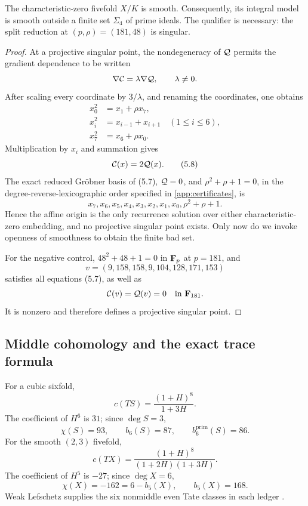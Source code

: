 \begin{proposition}\label{prop:smoothness}
The characteristic-zero fivefold \(X/K\) is smooth.  Consequently, its
integral model is smooth outside a finite set \(\Sigma_4\) of prime ideals.
The qualifier is necessary: the split reduction at
\((p,\rho)=(181,48)\) is singular.
\end{proposition}

\begin{proof}
At a projective singular point, the nondegeneracy of \(\mathcal Q\) permits the
gradient dependence to be written
\[
 \nabla\mathcal C=\lambda\nabla\mathcal Q,\qquad \lambda\ne0.
\]
After scaling every coordinate by \(3/\lambda\), and renaming the
coordinates, one obtains
\[
\begin{aligned}
 x_0^2&=x_1+\rho x_7,\\
 x_i^2&=x_{i-1}+x_{i+1}\quad(1\le i\le6),\\
 x_7^2&=x_6+\rho x_0.
\end{aligned}                                           \tag{5.7}
\]
Multiplication by \(x_i\) and summation gives
\[
 \mathcal C(x)=2\mathcal Q(x).                                       \tag{5.8}
\]
The exact reduced Gr\"obner basis of (5.7), \(\mathcal Q=0\), and
\(\rho^2+\rho+1=0\), in the degree-reverse-lexicographic order specified in
\cref{app:certificates}, is
\[
 x_7,x_6,x_5,x_4,x_3,x_2,x_1,x_0,\rho^2+\rho+1.        \tag{5.9}
\]
Hence the affine origin is the only recurrence solution over either
characteristic-zero embedding, and no projective singular point exists.
Only now do we invoke openness of smoothness to obtain the finite bad set.

For the negative control, \(48^2+48+1=0\) in \(\mathbf F_p\) at \(p=181\), and
\[
 v=(9,158,158,9,104,128,171,153)                       \tag{5.10}
\]
satisfies all equations (5.7), as well as
\[
 \mathcal C(v)=\mathcal Q(v)=0\quad\text{in }\mathbf F_{181}.
\]
It is nonzero and therefore defines a projective singular point.
\end{proof}

\subsection{Middle cohomology and the exact trace formula}

For a cubic sixfold,
\[
 c(TS)=\frac{(1+H)^8}{1+3H}.
\]
The coefficient of \(H^6\) is \(31\); since \(\deg S=3\),
\[
 \chi(S)=93,\qquad b_6(S)=87,\qquad
 b_6^{\mathrm{prim}}(S)=86.                            \tag{5.11}
\]
For the smooth \((2,3)\) fivefold,
\[
 c(TX)=\frac{(1+H)^8}{(1+2H)(1+3H)}.
\]
The coefficient of \(H^5\) is \(-27\); since \(\deg X=6\),
\[
 \chi(X)=-162=6-b_5(X),\qquad b_5(X)=168.               \tag{5.12}
\]
Weak Lefschetz supplies the six nonmiddle even Tate classes in each ledger
\cite[Expos\'e~XIV, Corollaire~4.6]{SGA2}.

